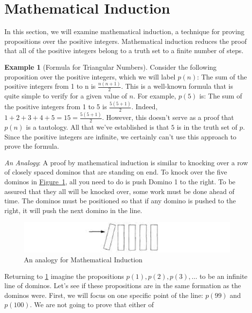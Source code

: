 \documentclass[10pt,]{book}
\theoremstyle{plain}
\theoremstyle{definition}
\theoremstyle{definition}
\theoremstyle{definition}
\newtheorem{example}[theorem]{Example}
\theoremstyle{definition}
\begin{document}
\section[Mathematical Induction]{Mathematical Induction}\label{c3s7}
In this section, we will examine mathematical induction, a technique for proving propositions over the positive integers. 
Mathematical induction reduces the proof that all of the positive integers belong to a truth set to a finite number of steps.%
\begin{example}[Formula for Triangular Numbers]\label{ex-triangular-numbers}
 Consider the following proposition over the positive integers, which we will label \(p(n)\): The sum of the positive integers from 1 to n is \(\frac{n (n+1)}{2}\). This is a well-known formula that is quite simple to verify for a given value of \(n\).   For example, \(p(5)\) is: The sum of the positive integers from 1 to 5 is \(\frac{5 (5+1)}{2}\). Indeed, \(1 + 2 + 3 + 4 + 5= 15 =\frac{5
(5+1)}{2}\). However, this doesn't serve as a proof that \(p(n)\) is a tautology. All that we've established is that \(5\) is in the truth set of \(p\). Since the positive integers are infinite, we certainly can't use this approach to prove the formula.%
\end{example}
\par
\emph{An Analogy}: A proof by mathematical induction is similar to knocking over a row of closely spaced dominos that are standing on end. To knock over the five dominos in \hyperref[dominos]{Figure~\ref{dominos}}, all you need to do is push Domino 1 to the right. To be assured that they all will be knocked over, some work must be done ahead of time. The dominos must be positioned so that if any domino is pushed to the right, it will push the next domino in the line.%
\leavevmode%
\begin{figure}
\centering
\includegraphics[width=1\linewidth]{images/dominos.png}
\caption{An analogy for Mathematical Induction
                \label{dominos}}
\end{figure}
\par
Returning to  \hyperref[ex-triangular-numbers]{\ref{ex-triangular-numbers}} imagine the propositions \(p(1), p(2), p(3),\ldots\) to be an infinite line of dominos. Let's see if these propositions are in the same formation as the dominos were.  First, we will focus on one specific point of the line: \(p(99)\) and \(p(100)\). We are not going to prove that either of
\end{document}
